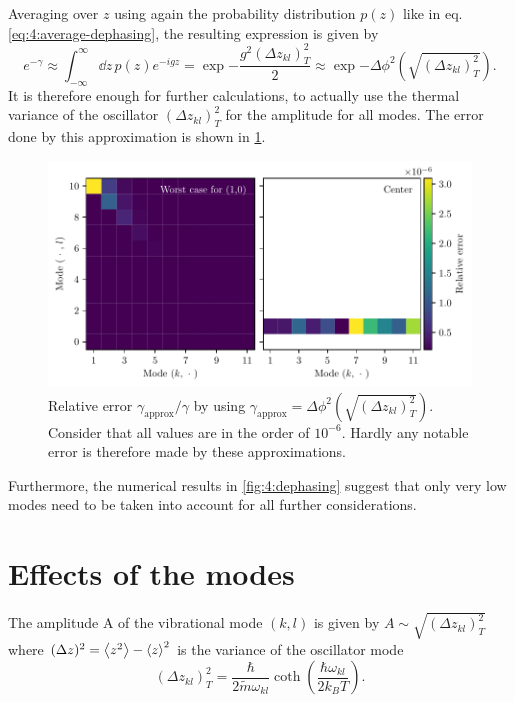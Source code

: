 Averaging over $z$ using again the probability distribution $p(z)$ like in eq. \eqref{eq:4:average-dephasing}, the resulting expression is given by
\begin{equation}
  e^{-\gamma} \approx \int_{-\infty}^{\infty} \dd z \, p(z) e^{-i g z} = \exp{-\frac{g^2 (\Delta z_{kl})^2_T}{2}} \approx \exp{-\Delta\phi^2\left(\sqrt{(\Delta z_{kl})^2_T}\right)} .
\end{equation}
It is therefore enough for further calculations, to actually use the thermal variance of the oscillator $(\Delta z_{kl})^2_T$ for the amplitude for all modes. The error done by this approximation is shown in \cref{fig:4:dephasing-approximation-error}.
\begin{figure}[!htbp]
  \centering
  \includegraphics[width=\textwidth]{./../figures/vibrations/vibrational-dephasing-approximation-error.pdf}
  \caption{Relative error $\gamma_\mathrm{approx} / \gamma$ by using $\gamma_\mathrm{approx} = \Delta\phi^2\left(\sqrt{(\Delta z_{kl})^2_T}\right)$. Consider that all values are in the order of $10^{-6}$. Hardly any notable error is therefore made by these approximations.}
  \label{fig:4:dephasing-approximation-error}
\end{figure}
Furthermore, the numerical results in \cref{fig:4:dephasing} suggest that only very low modes need to be taken into account for all further considerations.


\section{Effects of the modes}


The amplitude A of the vibrational mode $(k,l)$ is given by $A \sim \sqrt{(\Delta z_{kl})^2_T}$ where $(\Delta z)^2 = \left\langle z^2\right\rangle - \left\langle z\right\rangle^2$ is the variance of the oscillator mode
\begin{equation}
  (\Delta z_{kl})^2_T = \frac{\hbar}{2\tilde{m}\omega_{kl}} \coth(\frac{\hbar \omega_{kl}}{2 k_B T}) .
\end{equation}

